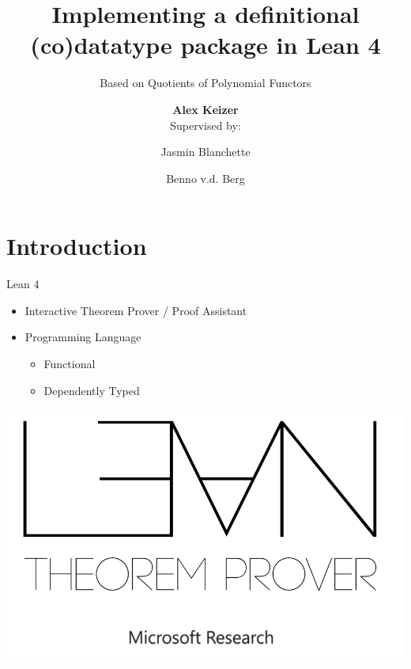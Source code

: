 \documentclass[t,12pt]{beamer}
\title[]{Implementing a definitional (co)datatype package in Lean 4}
\subtitle{Based on Quotients of Polynomial Functors}
\date{}
\author{\textbf{Alex Keizer} \\ Supervised by: \and Jasmin Blanchette \and Benno v.d. Berg}
\begin{document}
\nonstopmode{} %



\section*{Introduction}

 {
  \begin{frame}[plain]
      \maketitle
  \end{frame}
  \addtocounter{framenumber}{-1}%
 }

 {
  \begin{frame}{Lean 4}
      \begin{itemize}
          \item Interactive Theorem Prover / Proof Assistant
          \item Programming Language
                \begin{itemize}
                    \item Functional
                    \item Dependently Typed
                \end{itemize}          
      \end{itemize}

      \bigskip

    \begin{center}
      \includegraphics[scale=0.25]{lean.png}
    \end{center}

  \end{frame}
 }
\end{document}
